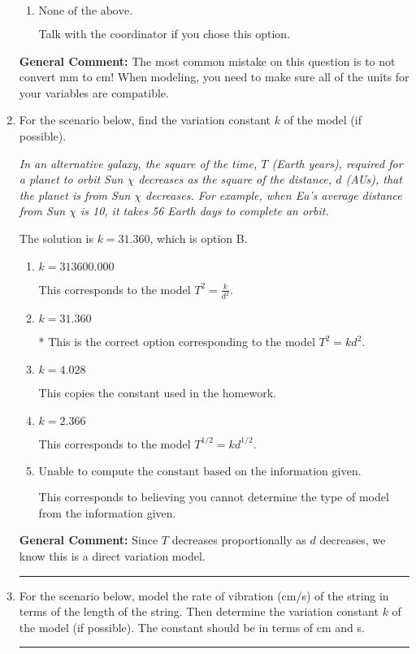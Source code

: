 \documentclass{extbook}[14pt]
\newcommand{\litem}[1]{\item #1

\rule{\textwidth}{0.4pt}}
\begin{document}
\begin{enumerate}
{\begin{enumerate}[label=\Alph*.]
This option uses the correct model, $R = \frac{k}{l^{3}}$, but does not convert from mm to cm so that the units match.
\item \( \text{None of the above.} \)

Talk with the coordinator if you chose this option.
\end{enumerate}

\textbf{General Comment:} The most common mistake on this question is to not convert mm to cm! When modeling, you need to make sure all of the units for your variables are compatible.
}
\litem{
For the scenario below, find the variation constant $k$ of the model (if possible).

\begin{center}
    \textit{ In an alternative galaxy, the square of the time, $T$ (Earth years), required for a planet to orbit Sun $\chi$ decreases as the square of the distance, $d$ (AUs), that the planet is from Sun $\chi$ decreases. For example, when Ea's average distance from Sun $\chi$ is 10, it takes 56 Earth days to complete an orbit. }
\end{center}
The solution is \( k = 31.360 \), which is option B.\begin{enumerate}[label=\Alph*.]
\item \( k = 313600.000 \)

This corresponds to the model $T^{2} = \frac{k}{d^{2}}$.
\item \( k = 31.360 \)

* This is the correct option corresponding to the model $T^{2} = k d^{2}$.
\item \( k = 4.028 \)

This copies the constant used in the homework.
\item \( k = 2.366 \)

This corresponds to the model $T^{1/2} = k d^{1/2}$.
\item \( \text{Unable to compute the constant based on the information given.} \)

This corresponds to believing you cannot determine the type of model from the information given.
\end{enumerate}

\textbf{General Comment:} Since $T$ decreases proportionally as $d$ decreases, we know this is a direct variation model.
}
\litem{
For the scenario below, model the rate of vibration (cm/s) of the string in terms of the length of the string. Then determine the variation constant $k$ of the model (if possible). The constant should be in terms of cm and s.

}
\end{enumerate}
\end{document}
